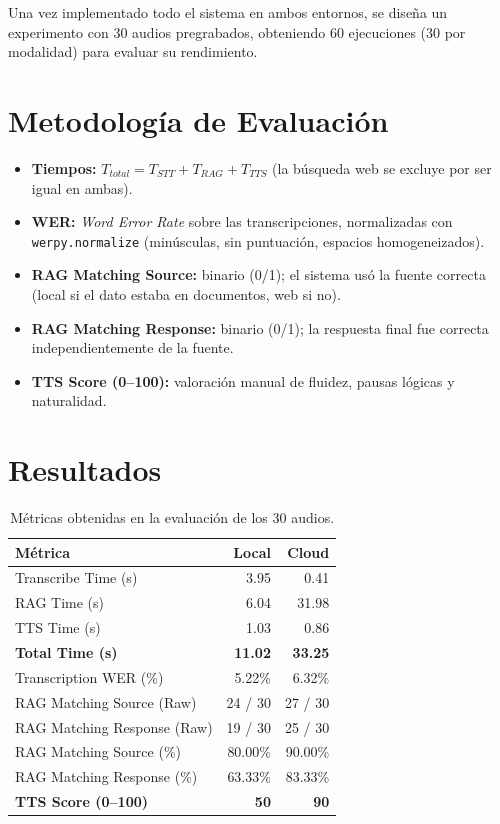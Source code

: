 \documentclass[11pt,spanish,listoffigures,listoftables]{tfgetsinf}
\begin{document}
Una vez implementado todo el sistema en ambos entornos, se diseña un experimento con 30 audios pregrabados, obteniendo 60 ejecuciones (30 por modalidad) para evaluar su rendimiento. 

\section{Metodología de Evaluación}

\begin{itemize}
    \item \textbf{Tiempos:} $T_{total} = T_{STT} + T_{RAG} + T_{TTS}$ (la búsqueda web se excluye por ser igual en ambas).
    \item \textbf{WER:} \textit{Word Error Rate} sobre las transcripciones, normalizadas con \texttt{werpy.normalize} \cite{werpy-2024} (minúsculas, sin puntuación, espacios homogeneizados).
    \item \textbf{RAG Matching Source:} binario (0/1); el sistema usó la fuente correcta (local si el dato estaba en documentos, web si no).
    \item \textbf{RAG Matching Response:} binario (0/1); la respuesta final fue correcta independientemente de la fuente.
    \item \textbf{TTS Score (0–100):} valoración manual de fluidez, pausas lógicas y naturalidad.
\end{itemize}

\section{Resultados}

\begin{table}[H]
\centering
\caption{Métricas obtenidas en la evaluación de los 30 audios.}
\label{tab:results_metrics}
\renewcommand{\arraystretch}{1.2}
\begin{tabular}{@{}lrr@{}}
\toprule
\textbf{Métrica}                  & \textbf{Local} & \textbf{Cloud} \\ \midrule
Transcribe Time (s)               & 3.95           & 0.41           \\
RAG Time (s)                      & 6.04           & 31.98          \\
TTS Time (s)                      & 1.03           & 0.86           \\
\textbf{Total Time (s)}           & \textbf{11.02} & \textbf{33.25} \\ \midrule
Transcription WER (\%)            & 5.22\%         & 6.32\%         \\ \midrule
RAG Matching Source (Raw)         & 24 / 30        & 27 / 30        \\
RAG Matching Response (Raw)       & 19 / 30        & 25 / 30        \\ 
RAG Matching Source (\%)          & 80.00\%        & 90.00\%        \\
RAG Matching Response (\%)        & 63.33\%        & 83.33\%        \\ \midrule
\textbf{TTS Score (0–100)}        & \textbf{50}    & \textbf{90}    \\ \bottomrule
\end{tabular}
\end{table}
\end{document}
